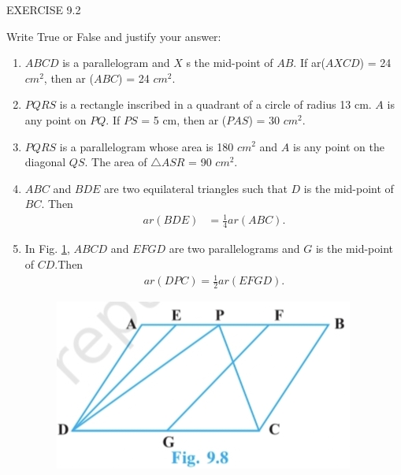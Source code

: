 \documentclass{article}
\begin{document}
\begin{center}
\color{cyan} EXERCISE 9.2
\end{center}
Write True or False and justify your answer:
\begin{enumerate}
	\item $ABCD$ is a parallelogram and $X$ s the mid-point of $AB$. If ar($AXCD$) = 24 \(cm^2\), then ar ($ABC$) = 24 \(cm^2\).
	\item $PQRS$ is a rectangle inscribed in a quadrant of a circle of radius 13 cm. $A$ is any point on $PQ$. If $PS$ = 5 cm, then ar ($PAS$) = 30 \(cm^2\).
	\item $PQRS$ is a parallelogram whose area is 180 \(cm^2\) and $A$ is any point on the diagonal $QS$. The area of $\triangle{ASR}$ = 90 \(cm^2\).
	\item $ABC$ and $BDE$ are two equilateral triangles such that $D$ is the mid-point of $BC$. Then
	\begin{align}
		{ar (BDE)} &= \frac{1}{4} {ar (ABC)}.
		\label{eq:9.24}
	\end{align}
\item    In Fig. \ref{fig:925}, $ABCD$ and $EFGD$ are     two parallelograms and $G$ is the mid-point of $CD$.Then
		\begin{align}
			{ar (DPC)} = \frac{1}{2} {ar (EFGD)}.
			\label{eq:9.25}
		\end{align}
\begin{figure}[h]
	\centering
	\includegraphics[width=\columnwidth]{figs/925.jpg}
	\caption{}
	\label{fig:925}
\end{figure}
\end{enumerate}
\end{document}

